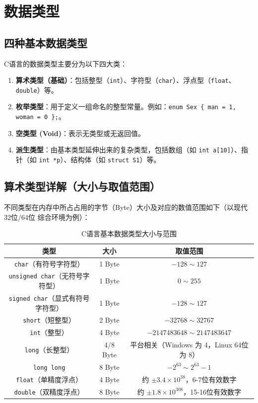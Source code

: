 \clearpage
\begingroup
\let\clearpage\relax
\let\cleardoublepage\relax
\vspace*{\fill}
\chapter{数据类型}
\vspace*{\fill}
\endgroup
\clearpage


\section{四种基本数据类型}

C语言的数据类型主要分为以下四大类：

\begin{enumerate}
    \item \textbf{算术类型（基础）}：包括整型（\texttt{int}）、字符型（\texttt{char}）、浮点型（\texttt{float}、\texttt{double}）等。
    \item \textbf{枚举类型}：用于定义一组命名的整型常量。例如：\texttt{enum Sex \{ man = 1, woman = 0 \};}。
    \item \textbf{空类型 (Void)}：表示无类型或无返回值。
    \item \textbf{派生类型}：由基本类型延伸出来的复杂类型，包括数组（如 \texttt{int a[10]}）、指针（如 \texttt{int *p}）、结构体（如 \texttt{struct S1}）等。
\end{enumerate}

\section{算术类型详解（大小与取值范围）}

不同类型在内存中所占占用的字节（Byte）大小及对应的数值范围如下（以现代 32位/64位 综合环境为例）：

\begin{table}[H]
\centering
\renewcommand{\arraystretch}{1.5}
\begin{tabulary}{\linewidth}{CCC}
\toprule
\textbf{类型} & \textbf{大小} & \textbf{取值范围} \\ \midrule
\texttt{char}（有符号字符型） & 1 Byte & $-128 \sim 127$ \\ 
\texttt{unsigned char}（无符号字符型） & 1 Byte & $0 \sim 255$ \\ 
\texttt{signed char}（显式有符号字符型） & 1 Byte & $-128 \sim 127$ \\ 
\texttt{short}（短整型） & 2 Byte & $-32768 \sim 32767$ \\ 
\texttt{int}（整型） & 4 Byte & $-2147483648 \sim 2147483647$ \\ 
\texttt{long}（长整型） & 4/8 Byte & 平台相关（Windows 为 4，Linux 64位 为 8） \\ 
\texttt{long long} & 8 Byte & $-2^{63} \sim 2^{63}-1$ \\ 
\texttt{float}（单精度浮点） & 4 Byte & 约 $\pm 3.4 \times 10^{38}$，6-7位有效数字 \\ 
\texttt{double}（双精度浮点） & 8 Byte & 约 $\pm 1.8 \times 10^{308}$，15-16位有效数字 \\ \bottomrule
\end{tabulary}
\caption{C语言基本数据类型大小与范围}
\label{tab:data_types}
\end{table}

